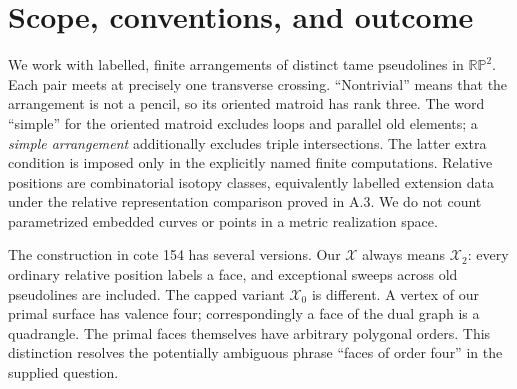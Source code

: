 \begin{abstract}
We determine the surface obtained by Grothendieck's corrected disk gluing
for every finite non-pencil arrangement of distinct pseudolines in the
projective plane, allowing multiple intersections. We use the variant
$\mathcal X_2$ of cote 154, scans 5 and 7. If $c_j$ counts the ordinary
unoriented relative positions passing through exactly $j$ old vertices,
then
\[
 \mathcal X_2\cong
 \#^{\,n+1+4\sum_{k\ge1}k c_{2k+1}}\mathbb {RP}^{2}.
\]
We prove that the gluing is well defined, every closed cell embeds,
and every vertex link is a four-cycle. The extension quotient is
homotopy equivalent to $\mathbb {RP}^{2}$; its specified real blow-up
at the parallel extensions is homotopy equivalent to
$\#^{n+1}\mathbb {RP}^{2}$. The dual manuscript surface is an explicitly
described subcomplex of that blow-up, and the inclusion is a homotopy
equivalence exactly when no ordinary position passes through three old
vertices. A fully enumerated six-line arrangement has
$(s_0,s_1,s_2)=(360,720,315)$ and genus 47, refuting the proposed
universal Euler formula. We also give an exact finite image criterion
for deployed polygons, reconstruct the weighted cellular graph,
prove the disk sufficiency and cluster-reversal statements, and
separate the boundary-to-interior tethers of cote 156-4 from proper
chords. All finite counterexamples come with exact code and outputs.
\end{abstract}

\tableofcontents
\newpage
\section*{Scope, conventions, and outcome}
We work with labelled, finite arrangements of distinct tame pseudolines
in $\mathbb {RP}^{2}$. Each pair meets at precisely one transverse
crossing. ``Nontrivial'' means that the arrangement is not a pencil,
so its oriented matroid has rank three. The word ``simple'' for the
oriented matroid excludes loops and parallel old elements; a
\emph{simple arrangement} additionally excludes triple intersections.
The latter extra condition is imposed only in the explicitly named
finite computations. Relative positions are combinatorial isotopy
classes, equivalently labelled extension data under the relative
representation comparison proved in A.3. We do not count parametrized
embedded curves or points in a metric realization space.

The construction in cote 154 has several versions. Our $\mathcal X$
always means $\mathcal X_2$: every ordinary relative position labels a
face, and exceptional sweeps across old pseudolines are included.
The capped variant $\mathcal X_0$ is different. A vertex of our primal
surface has valence four; correspondingly a face of the dual graph is
a quadrangle. The primal faces themselves have arbitrary polygonal
orders. This distinction resolves the potentially ambiguous phrase
``faces of order four'' in the supplied question.

